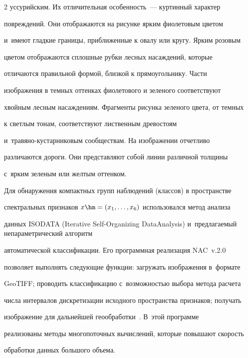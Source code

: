 \begin{multicols}{2}
уссурийским. Их отличительная особенность~--- куртинный характер 


повреждений. Они отображаются на рисунке ярким фиолетовым цветом 


и~имеют гладкие границы, приближенные к овалу или кругу. Ярким розовым 


цветом отображаются сплош\-ные руб\-ки лесных насаждений, которые 


отличаются правильной формой, близкой к прямоугольнику. Части 


изображения в темных оттенках фиолетового и зеленого соответствуют 


хвойным лесным насаждениям. Фрагменты рисунка зеленого цвета, от темных 


к светлым тонам, соответствуют лиственным древостоям  


и~тра\-вя\-но-кус\-тар\-ни\-ко\-вым сообществам. На изображении отчетливо 


различаются дороги. Они представляют собой линии различной толщины 


с~ярким зеленым или желтым оттенком.


  


  Для обнаружения компактных групп наблюдений (классов) в пространстве 


спектральных признаков $x\hm= (x_1,\ldots , x_6)$ использовался метод анализа 


данных ISODATA (Iterative Self-Organizing Data\linebreak Analysis) и~пред\-ла\-га\-емый не\-па\-ра\-мет\-ри\-че\-ский алгоритм 


автоматической классификации. Его программная реализация NAC~v.2.0 


поз\-во\-ля\-ет выполнять сле\-ду\-ющие функции: за\-гру\-жать \mbox{изоб\-ра\-же\-ния} в~формате 


GeoTIFF; проводить классификацию с~воз\-мож\-ностью выбора метода расчета 


чис\-ла интервалов дискретизации исходного пространства признаков; получать 


изобра\-же\-ние для дальнейшей гео\-об\-ра\-бо\-тки~\cite{16-l}. В~этой программе 


реализованы методы многопоточных вы\-чис\-ле\-ний, которые повышают ско\-рость 


обработки данных большого объема.





\begin{figure} %



\end{figure}
\end{multicols}
